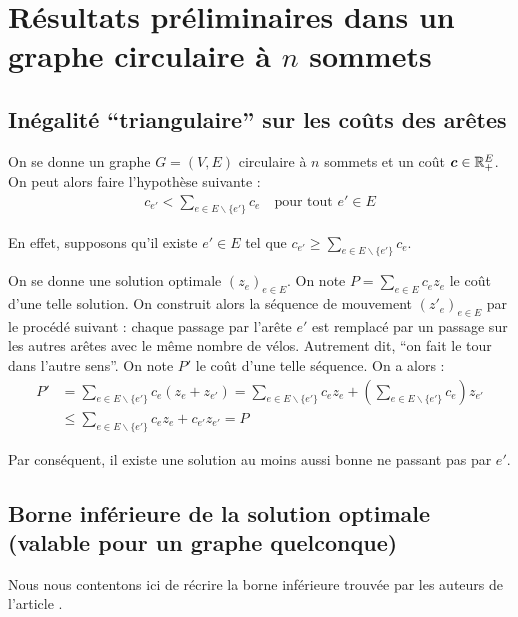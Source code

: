 \chapter{Résultats préliminaires dans un graphe circulaire à $n$ sommets}
\label{Résultats préliminaires}

\section{Inégalité ``triangulaire'' sur les coûts des arêtes}
\label{sec: Inégalité triangulaire}

On se donne un graphe $G=(V,E)$ circulaire à $n$ sommets et un coût $\boldsymbol{c} \in \mathbb{R}^E_+$. On peut alors faire l'hypothèse suivante :
\begin{gather}\label{Inégalité Triangulaire}
  c_{e'}<\sum_{e \in E \backslash \{e'\}} c_e \quad \text{pour tout } e' \in E
\end{gather}

En effet, supposons qu'il existe $e' \in E$ tel que $c_{e'} \ge \sum_{e \in E \backslash \{e'\}} c_e$.

On se donne une solution optimale $(z_e)_{e \in E}$. On note $P = \sum_{e \in E} c_ez_e$ le coût d'une telle solution. On construit alors la séquence de mouvement $(z'_e)_{e \in E}$ par le procédé suivant : chaque passage par l'arête $e'$ est remplacé par un passage sur les autres arêtes avec le même nombre de vélos. Autrement dit, ``on fait le tour dans l'autre sens''. On note $P'$ le coût d'une telle séquence. On a alors :
\begin{align*}
  P' &= \sum_{e \in E \backslash \{e'\}} c_e (z_e + z_{e'}) = \sum_{e \in E \backslash \{e'\}} c_ez_e + \left(\sum_{e \in E \backslash \{e'\}} c_{e}\right)z_{e'} \\
     &\le \sum_{e \in E \backslash \{e'\}} c_ez_e + c_{e'}z_{e'} = P
\end{align*}

Par conséquent, il existe une solution au moins aussi bonne ne passant pas par $e'$.

\section{Borne inférieure de la solution optimale (valable pour un graphe quelconque)}
\label{Borne inf générale}

Nous nous contentons ici de récrire la borne inférieure trouvée par les auteurs de l'article \cite{Benchimol2011}.
\\

